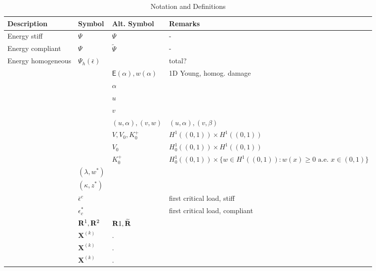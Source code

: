 



\begin{table}[h!]
    \centering
    \begin{tabular}{  m{3.5cm}  m{3cm}  m{2.5cm}  m{6cm}  }
      \hline
      \textbf{Description} & \textbf{Symbol} & \textbf{Alt. Symbol} & \textbf{Remarks} \\
      \hline
      Energy stiff     & $\Psi$ & $\Psi$ & - \\
      Energy compliant & $\Psi$ & $\widetilde \Psi$ & - \\
      Energy homogeneous & $\Psi_h(\bar\epsilon)$ &  & total? \\
      & & $\mathsf E(\alpha), w(\alpha)$ & 1D Young, homog. damage\\
      & & $\alpha$ & \\
      & & $u$ & \\
      & & $v$ & \\
      & & $(u,\alpha), (v, w)$ & $(u,\alpha), (v, \beta)$ \\
      & & $V, V_0, K^+_0$ & $H^1((0,1))\times  H^1((0,1))$\\
      & & $V_0$ & $H^1_0((0,1))\times  H^1((0,1))$\\
      & & $K^+_0$ & $H^1_0((0, 1))\times \{w \in H^1((0, 1)): w(x) \geq 0 \text{ a.e. }x\in (0, 1)\}$\\
      & $(\lambda, w^*)$ &  & \\
      & $(\kappa, z^*)$ &  & \\
      & $\bar \epsilon^c$ &  & first critical load, stiff\\
      & $\epsilon_c^*$ &  & first critical load, compliant \\
      & ${\bf R}^1, {\bf R}^2$ & ${\bf R}1, \widetilde{\bf R}$ & \\
      & $\mathbf{X}^{(k)}$ & $.$ & \\
      & $\mathbf{X}^{(k)}$ & $.$ & \\
      & $\mathbf{X}^{(k)}$ & $.$ & \\
    \end{tabular}
    \caption{Notation and Definitions}
\label{table:notation}
\end{table}

